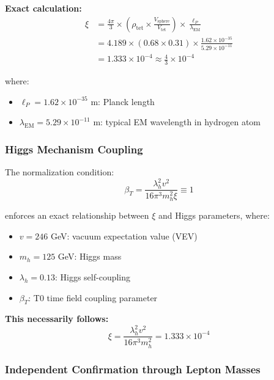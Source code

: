 \documentclass[12pt,a4paper]{article}
\numberwithin{equation}{section}
\newcommand{\xipar}{\xi}
\newcommand{\lP}{\ell_P}
\newcommand{\lambdaEM}{\lambda_{\text{EM}}}
\begin{document}
	\textbf{Exact calculation:}
	\begin{align}
		\xipar &= \frac{4\pi}{3} \times \left(\rho_{\text{tet}} \times \frac{V_{\text{sphere}}}{V_{\text{tet}}}\right) \times \frac{\lP}{\lambdaEM}\\
		&= 4.189 \times (0.68 \times 0.31) \times \frac{1.62 \times 10^{-35}}{5.29 \times 10^{-11}}\\
		&= 1.333 \times 10^{-4} \approx \frac{4}{3} \times 10^{-4}
		\label{eq:xi_geometric}
	\end{align}
	
	where:
	\begin{itemize}
		\item $\lP = 1.62 \times 10^{-35}$ m: Planck length
		\item $\lambdaEM = 5.29 \times 10^{-11}$ m: typical EM wavelength in hydrogen atom
	\end{itemize}
	
	\subsubsection{Higgs Mechanism Coupling}
	
	The normalization condition:
	\begin{equation}
		\beta_T = \frac{\lambda_h^2 v^2}{16\pi^3 m_h^2 \xipar} \equiv 1
		\label{eq:beta_normierung}
	\end{equation}
	
	enforces an exact relationship between $\xipar$ and Higgs parameters, where:
	\begin{itemize}
		\item $v = 246$ GeV: vacuum expectation value (VEV)
		\item $m_h = 125$ GeV: Higgs mass
		\item $\lambda_h = 0.13$: Higgs self-coupling
		\item $\beta_T$: T0 time field coupling parameter
	\end{itemize}
	
	\textbf{This necessarily follows:}
	\begin{equation}
		\xipar = \frac{\lambda_h^2 v^2}{16\pi^3 m_h^2} = 1.333 \times 10^{-4}
		\label{eq:xi_higgs}
	\end{equation}
	
	\subsubsection{Independent Confirmation through Lepton Masses}
	
\end{document}
